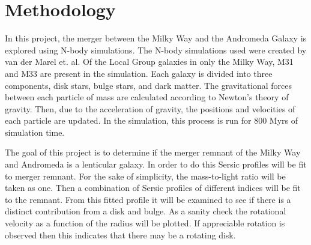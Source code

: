 \documentclass[fleqn,usenatbib]{mnras}
\begin{document}


\section{Methodology}
In this project, the merger between the Milky Way and the Andromeda Galaxy is explored using N-body simulations. The N-body simulations used were created by van der Marel et. al. \cite{van_der_Marel_2012_1,van_der_Marel_2012_2} Of the Local Group galaxies in only the Milky Way, M31 and M33 are present in the simulation. Each galaxy is divided into three components, disk stars, bulge stars, and dark matter. The gravitational forces between each particle of mass are calculated according to Newton's theory of gravity. Then, due to the acceleration of gravity, the positions and velocities of each particle are updated.  In the simulation, this process is run for 800 Myrs of simulation time.

The goal of this project is to determine if the merger remnant of the Milky Way and Andromeda is a lenticular galaxy. In order to do this Sersic profiles will be fit to merger remnant. For the sake of simplicity, the mass-to-light ratio will be taken as one. Then a combination of Sersic profiles of different indices will be fit to the remnant. From this fitted profile it will be examined to see if there is a distinct contribution from a disk and bulge. As a sanity check the rotational velocity as a function of the radius will be plotted. If appreciable rotation is observed then this indicates that there may be a rotating disk. 
\end{document}
